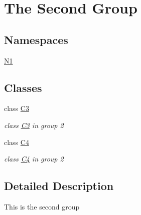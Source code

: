\hypertarget{group__group2}{}\section{The Second Group}
\label{group__group2}
\subsection*{Namespaces}
\begin{DoxyCompactItemize}
\item 
 \mbox{\hyperlink{namespace_n1}{N1}}
\end{DoxyCompactItemize}
\subsection*{Classes}
\begin{DoxyCompactItemize}
\item 
class \mbox{\hyperlink{class_c3}{C3}}
\begin{DoxyCompactList}\small\item\em class \mbox{\hyperlink{class_c3}{C3}} in group 2 \end{DoxyCompactList}\item 
class \mbox{\hyperlink{class_c4}{C4}}
\begin{DoxyCompactList}\small\item\em class \mbox{\hyperlink{class_c4}{C4}} in group 2 \end{DoxyCompactList}\end{DoxyCompactItemize}


\subsection{Detailed Description}
This is the second group 